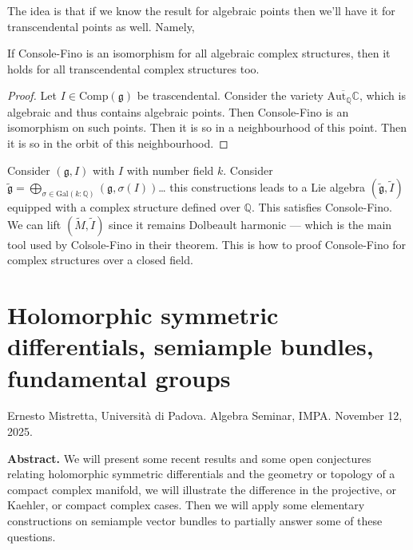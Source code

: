 \noindent
The idea is that if we know the result for
algebraic
points then we'll have it for transcendental
points as well.
Namely,

\begin{lemma}
\label{lemma-if-conso-fino-algeb-then-hold}
If Console-Fino is an isomorphism for all
algebraic complex structures,
then it holds for all transcendental complex
structures too.
\end{lemma}

\begin{proof}
Let $I \in \text{Comp}(\mathfrak{g})$ be
trascendental.
Consider the variety
$\overline{\text{Aut}_{\mathbb{Q}}\mathbb{C}}
$,
which is algebraic and thus contains
algebraic points.
Then Console-Fino is an isomorphism on such
points.
Then it is so in a neighbourhood of this
point.
Then it is so in the orbit of this
neighbourhood.
\end{proof}

\noindent
Consider $(\mathfrak{g},I)$ with $I$ with
number field $k$.
Consider
$\tilde{\mathfrak{g}}=\bigoplus_{\sigma \in
\text{Gal}(k:\mathbb{Q})}
(\mathfrak{g},\sigma(I))$…
this constructions leads to a Lie algebra
$(\tilde{\mathfrak{g}},\tilde{I})$
equipped with a complex structure defined
over $\mathbb{Q}$.
This satisfies Console-Fino. We can lift
$(\tilde{M},\tilde{I})$
since it remains Dolbeault harmonic --- which
is the main tool used by
Colsole-Fino in their theorem.
This is how to proof Console-Fino for complex
structures over a closed field.

\section{Holomorphic symmetric differentials,
semiample bundles,
fundamental groups}
\label{section-holom-symme-diffe-semia}

\noindent
Ernesto Mistretta, Università di Padova.
Algebra Seminar, IMPA.
November 12, 2025.

\medskip\noindent
{\bf Abstract.}
We will present some recent results and some
open conjectures relating
holomorphic symmetric differentials and the
geometry or topology of a compact
complex manifold, we will illustrate the
difference in the projective, or
Kaehler, or compact complex cases. Then we
will apply some elementary
constructions on semiample vector bundles to
partially answer some of these
questions.



